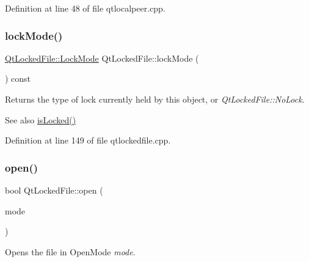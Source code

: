 Definition at line 48 of file qtlocalpeer.\+cpp.

\mbox{\label{class_qt_l_p___private_1_1_qt_locked_file_a0ae096d85cb722b1563521ad2b6dbde2}} 
\subsubsection{\texorpdfstring{lock\+Mode()}{lockMode()}}
{\footnotesize\ttfamily \hyperlink{class_qt_l_p___private_1_1_qt_locked_file_ab9a54228983e33cf1fb8dace52141f26}{Qt\+Locked\+File\+::\+Lock\+Mode} Qt\+Locked\+File\+::lock\+Mode (\begin{DoxyParamCaption}{ }\end{DoxyParamCaption}) const}

Returns the type of lock currently held by this object, or {\itshape Qt\+Locked\+File\+::\+No\+Lock}.

\begin{DoxySeeAlso}{See also}
\hyperlink{class_qt_l_p___private_1_1_qt_locked_file_a0800b8ae9f4d268fe6968b9075f64bb3}{is\+Locked()} 
\end{DoxySeeAlso}


Definition at line 149 of file qtlockedfile.\+cpp.

\mbox{\label{class_qt_l_p___private_1_1_qt_locked_file_a2e81bbaa7b1aaa83cf79284e66dbad79}} 
\subsubsection{\texorpdfstring{open()}{open()}}
{\footnotesize\ttfamily bool Qt\+Locked\+File\+::open (\begin{DoxyParamCaption}\item[{Open\+Mode}]{mode }\end{DoxyParamCaption})}

Opens the file in Open\+Mode {\itshape mode}.

